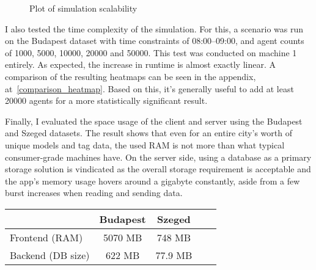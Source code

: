 \begin{figure}[!h]
    \centering
    \caption{Plot of simulation scalability}
\end{figure}

\label{perftesting-heatmap}
I also tested the time complexity of the simulation. For this, a scenario was run on the Budapest dataset with time constraints of 08:00--09:00, and agent counts of 1000, 5000, 10000, 20000 and 50000. This test was conducted on machine 1 entirely. As expected, the increase in runtime is almost exactly linear. A comparison of the resulting heatmaps can be seen in the appendix, at~\ref{comparison_heatmap}. Based on this, it's generally useful to add at least 20000 agents for a more statistically significant result.

Finally, I evaluated the space usage of the client and server using the Budapest and Szeged datasets. The result shows that even for an entire city's worth of unique models and tag data, the used RAM is not more than what typical consumer-grade machines have. On the server side, using a database as a primary storage solution is vindicated as the overall storage requirement is acceptable and the app's memory usage hovers around a gigabyte constantly, aside from a few burst increases when reading and sending data.

\begin{center}
    \begin{tabular}{l|cc|cc}
        \multicolumn{1}{c}{} & \multicolumn{1}{c}{Budapest} & \multicolumn{1}{c}{Szeged} \\
        \hline
        Frontend (RAM) & 5070 MB & 748 MB \\
        Backend (DB size) & 622 MB & 77.9 MB \\
        \end{tabular}
\end{center}


